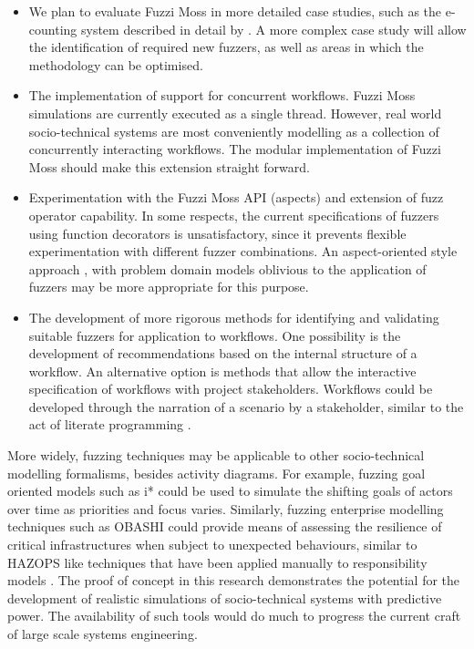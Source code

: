 \documentclass{sig-alternate}
\begin{document}
\begin{itemize}

\item We plan to evaluate Fuzzi Moss in more detailed case studies, such as the
  e-counting system described in detail by \citet{lock07observations}.  A more
  complex case study will allow the identification of required new fuzzers, as
  well as areas in which the methodology can be optimised.

\item The implementation of support for concurrent workflows.  Fuzzi Moss
  simulations are currently executed as a single thread.  However, real world
  socio-technical systems are most conveniently modelling as a collection of
  concurrently interacting workflows.  The modular implementation of Fuzzi Moss
  should make this extension straight forward.

\item Experimentation with the Fuzzi Moss API (aspects) and extension of fuzz
  operator capability.  In some respects, the current specifications of fuzzers
  using function decorators is unsatisfactory, since it prevents flexible
  experimentation with different fuzzer combinations.  An aspect-oriented style
  approach \citep{filman01aspect}, with problem domain models oblivious to the
  application of fuzzers may be more appropriate for this purpose.

\item The development of more rigorous methods for identifying and validating
  suitable fuzzers for application to workflows.  One possibility is the
  development of recommendations based on the internal structure of a workflow.
  An alternative option is methods that allow the interactive specification of
  workflows with project stakeholders.  Workflows could be developed through the
  narration of a scenario by a stakeholder, similar to the act of literate
  programming \cite{knuth84literate}.

\end{itemize}

More widely, fuzzing techniques may be applicable to other socio-technical
modelling formalisms, besides activity diagrams.  For example, fuzzing goal
oriented models such as i* could be used to simulate the shifting goals of
actors over time as priorities and focus varies.  Similarly, fuzzing enterprise
modelling techniques such as OBASHI could provide means of assessing the
resilience of critical infrastructures when subject to unexpected behaviours,
similar to HAZOPS like techniques that have been applied manually to
responsibility models \cite{lock09modelling}. The proof of concept in this
research demonstrates the potential for the development of realistic simulations
of socio-technical systems with predictive power.  The availability of such
tools would do much to progress the current craft of large scale systems
engineering.






\end{document}
